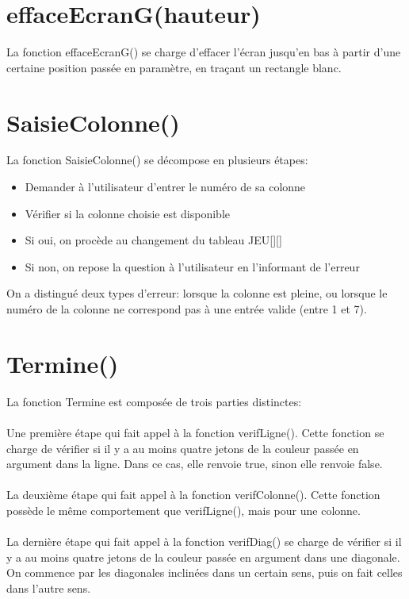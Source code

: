 \documentclass[a4paper]{report}
\begin{document}
\section*{effaceEcranG(hauteur)}
La fonction effaceEcranG() se charge d'effacer l'écran jusqu'en bas à partir d'une certaine position passée en paramètre, en traçant un rectangle blanc.

\section*{SaisieColonne()}
La fonction SaisieColonne() se décompose en plusieurs étapes:
\begin{itemize}
\item Demander à l'utilisateur d'entrer le numéro de sa colonne
\item Vérifier si la colonne choisie est disponible
\item Si oui, on procède au changement du tableau JEU[][]
\item Si non, on repose la question à l'utilisateur en l'informant de l'erreur
\end{itemize}
On a distingué deux types d'erreur: lorsque la colonne est pleine, ou lorsque le numéro de la colonne ne correspond pas à une entrée valide (entre 1 et 7).

\section*{Termine()}
La fonction Termine est composée de trois parties distinctes:
\paragraph{}
Une première étape qui fait appel à la fonction verifLigne(). Cette fonction se charge de vérifier si il y a au moins quatre jetons de la couleur passée en argument dans la ligne. Dans ce cas, elle renvoie true, sinon elle renvoie false.
\paragraph{}
La deuxième étape qui fait appel à la fonction verifColonne(). Cette fonction possède le même comportement que verifLigne(), mais pour une colonne.
\paragraph{}
La dernière étape qui fait appel à la fonction verifDiag() se charge de vérifier si il y a au moins quatre jetons de la couleur passée en argument dans une diagonale. On commence par les diagonales inclinées dans un certain sens, puis on fait celles dans l'autre sens.
\end{document}
